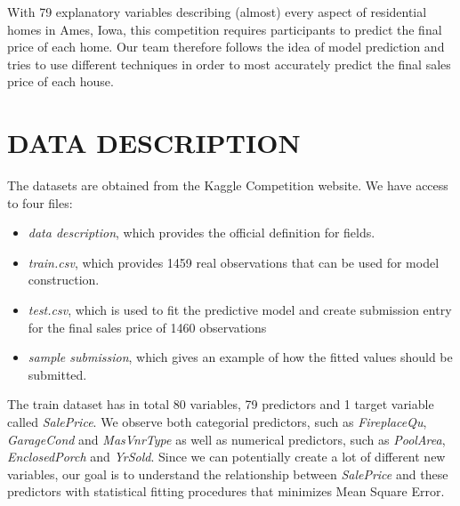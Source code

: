 \documentclass[letterpaper, 10 pt, conference]{ieeeconf}  %
\begin{document}
With 79 explanatory variables describing (almost) every aspect of residential homes in Ames, Iowa, this competition requires participants to predict the final price of each home. Our team therefore follows the idea of model prediction and tries to use different techniques in order to most accurately predict the final sales price of each house.

\section{DATA DESCRIPTION}
The datasets are obtained from the Kaggle Competition website. We have access to four files: 
\begin{itemize}
\item \textit{data description}, which provides the official definition for fields.
\item \textit{train.csv}, which provides 1459 real observations that can be used for model construction.
\item \textit{test.csv}, which is used to fit the predictive model and create submission entry for the final sales price of 1460 observations 
\item \textit{sample submission}, which gives an example of how the fitted values should be submitted.
\end{itemize}

The train dataset has in total 80 variables, 79 predictors and 1 target variable called \textit{SalePrice}. We observe both categorial predictors, such as \textit{FireplaceQu}, \textit{GarageCond} and \textit{MasVnrType} as well as numerical predictors, such as \textit{PoolArea}, \textit{EnclosedPorch} and \textit{YrSold}. Since we can potentially create a lot of different new variables, our goal is to understand the relationship between \textit{SalePrice} and these predictors with statistical fitting procedures that minimizes Mean Square Error.
\end{document}
